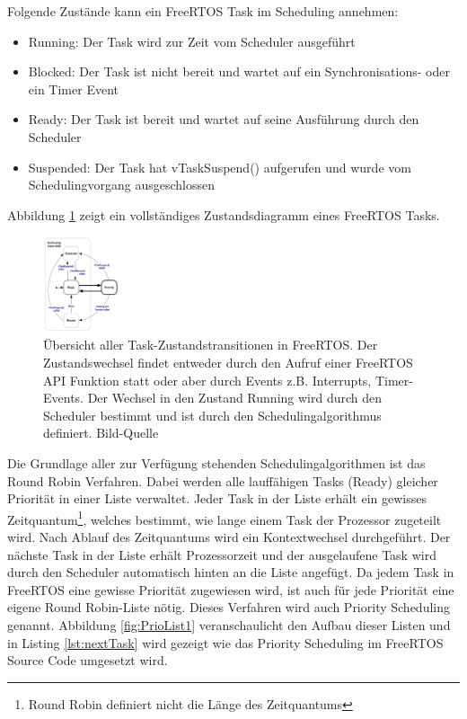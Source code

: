 Folgende Zu\-stän\-de kann ein FreeRTOS Task im Scheduling annehmen: 
\begin{itemize}
	\item Running: Der Task wird zur Zeit vom Scheduler ausgeführt
	\item Blocked: Der Task ist nicht bereit und wartet auf ein Synchronisations- oder ein Timer Event
	\item Ready: Der Task ist bereit und wartet auf seine Aus\-füh\-rung durch den Scheduler
	\item Suspended: Der Task hat vTaskSuspend() aufgerufen und wurde vom Schedulingvorgang ausgeschlossen
\end{itemize}
 Abbildung \ref{fig:TaskStates} zeigt ein vollständiges Zustandsdiagramm eines FreeRTOS Tasks.
\begin{figure}[ht!]
	\centering
		\includegraphics[width=0.2\textwidth]{Pictures/FreeRTOSOrg/taskStates.png}
	\caption{Übersicht aller Task-Zustandstransitionen in FreeRTOS. Der Zustandswechsel findet entweder durch den Aufruf einer FreeRTOS API Funktion statt oder aber durch Events z.B. Interrupts, Timer-Events. Der Wechsel in den Zustand Running wird durch den Scheduler bestimmt und ist durch den Schedulingalgorithmus definiert.  Bild-Quelle~\protect{}}
	\label{fig:TaskStates}
\end{figure} 
\newline
Die Grundlage aller zur Verfügung stehenden Scheduling\-algorithmen ist das Round Robin Verfahren\cite{9783827373427}. Dabei werden alle lauf\-fäh\-igen Tasks (Ready) gleicher Priorität in einer Liste verwaltet. Jeder Task in der Liste erhält ein gewisses Zeitquantum\footnote{Round Robin definiert nicht die Länge des Zeitquantums}, welches bestimmt, wie lange einem Task der Prozessor zugeteilt wird. Nach Ablauf des Zeitquantums wird ein Kontextwechsel durchgeführt. Der näch\-ste Task in der Liste erhält Prozessorzeit und der ausgelaufene Task wird durch den Scheduler automatisch hinten an die Liste angefügt. Da jedem Task in FreeRTOS eine gewisse Priorität zugewiesen wird, ist auch für jede Priorität eine eigene Round Robin-Liste nötig. Dieses Verfahren wird auch Priority Scheduling \cite{9783827373427} genannt. Abbildung \ref{fig:PrioList1} veranschaulicht den Aufbau dieser Listen und in Listing \ref{lst:nextTask} wird gezeigt wie das Priority Scheduling im FreeRTOS Source Code umgesetzt wird. 
